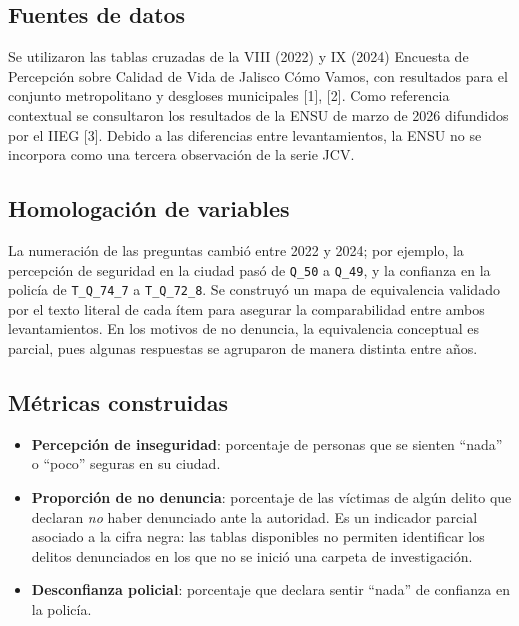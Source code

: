 \documentclass[10pt,twocolumn,letterpaper]{article}
\begin{document}
\subsection{Fuentes de datos}

Se utilizaron las tablas cruzadas de la VIII (2022) y IX (2024) Encuesta
de Percepción sobre Calidad de Vida de Jalisco Cómo Vamos, con resultados
para el conjunto metropolitano y desgloses municipales [1], [2]. Como
referencia contextual se consultaron los resultados de la ENSU de marzo
de 2026 difundidos por el IIEG [3]. Debido a las diferencias entre
levantamientos, la ENSU no se incorpora como una tercera observación de
la serie JCV.

\subsection{Homologación de variables}

La numeración de las preguntas cambió entre 2022 y 2024; por ejemplo, la
percepción de seguridad en la ciudad pasó de \texttt{Q\_50} a
\texttt{Q\_49}, y la confianza en la policía de \texttt{T\_Q\_74\_7} a
\texttt{T\_Q\_72\_8}. Se construyó un mapa de equivalencia validado por
el texto literal de cada ítem para asegurar la comparabilidad entre
ambos levantamientos. En los motivos de no denuncia, la equivalencia
conceptual es parcial, pues algunas respuestas se agruparon de manera
distinta entre años.

\subsection{Métricas construidas}

\begin{itemize}[leftmargin=*,itemsep=1pt,topsep=2pt]
  \item \textbf{Percepción de inseguridad}: porcentaje de personas que se
        sienten ``nada'' o ``poco'' seguras en su ciudad.
  \item \textbf{Proporción de no denuncia}: porcentaje de las víctimas de
        algún delito que declaran \emph{no} haber denunciado ante la
        autoridad. Es un indicador parcial asociado a la cifra negra:
        las tablas disponibles no permiten identificar los delitos
        denunciados en los que no se inició una carpeta de investigación.
  \item \textbf{Desconfianza policial}: porcentaje que declara sentir
        ``nada'' de confianza en la policía.
\end{itemize}
\end{document}
